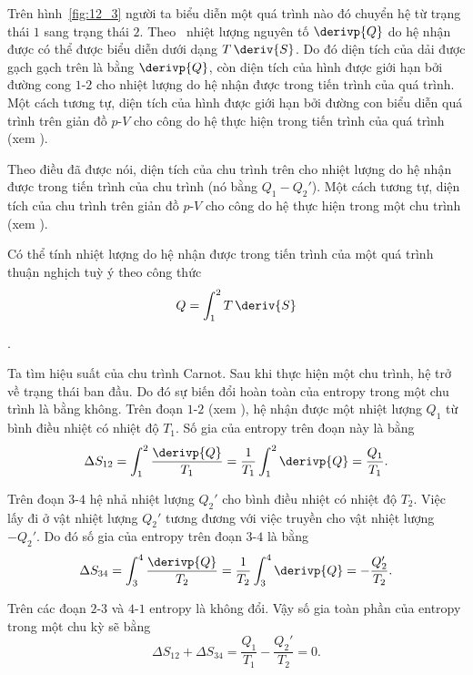 Trên hình~\ref{fig:12_3} người ta biểu diễn một quá trình nào đó chuyển hệ từ trạng thái $1$ sang trạng thái $2$. Theo~ nhiệt lượng nguyên tố $\derivp{Q}$ do hệ nhận được có thể được biểu diễn dưới dạng $T\,\deriv{S}$. Do đó diện tích của dải được gạch gạch trên  là bằng $\derivp{Q}$, còn diện tích của hình được giới hạn bởi đường cong $1$-$2$ cho nhiệt lượng do hệ nhận được trong tiến trình của quá trình. Một cách tương tự, diện tích của hình được giới hạn bởi đường con biểu diễn quá trình trên giản đồ $p$-$V$ cho công do hệ thực hiện trong tiến trình của quá trình (xem ).

Theo điều đã được nói, diện tích của chu trình trên  cho nhiệt lượng do hệ nhận được trong tiến trình của chu trình (nó bằng $Q_1-Q_2'$). Một cách tương tự, diện tích của chu trình trên giản đồ $p$-$V$ cho công do hệ thực hiện trong một chu trình (xem ).

Có thể tính nhiệt lượng do hệ nhận được trong tiến trình của một quá trình thuận nghịch tuỳ ý theo công thức
\begin{equation}\label{eq:12_9}
	Q = \int_{1}^{2} T\,\deriv{S}
\end{equation}

.

Ta tìm hiệu suất của chu trình Carnot. Sau khi thực hiện một chu trình, hệ trở về trạng thái ban đầu. Do đó sự biến đổi hoàn toàn của entropy trong một chu trình là bằng không. Trên đoạn $1$-$2$ (xem ), hệ nhận được một nhiệt lượng $Q_1$ từ bình điều nhiệt có nhiệt độ $T_1$. Số gia của entropy trên đoạn này là bằng
\begin{equation*}
	\Delta S_{12} = \int_{1}^{2} \frac{\derivp{Q}}{T_1} = \frac{1}{T_1} \int_{1}^{2} \derivp{Q} = \frac{Q_1}{T_1}.
\end{equation*}

\noindent
Trên đoạn $3$-$4$ hệ nhả nhiệt lượng $Q_2'$ cho bình điều nhiệt có nhiệt độ $T_2$. Việc lấy đi ở vật nhiệt lượng $Q_2'$ tương đương với việc truyền cho vật nhiệt lượng $-Q_2'$. Do đó số gia của entropy trên đoạn $3$-$4$ là bằng
\begin{equation*}
	\Delta S_{34} = \int_{3}^{4} \frac{\derivp{Q}}{T_2} = \frac{1}{T_2} \int_{3}^{4} \derivp{Q} = -\frac{Q_2'}{T_2}.
\end{equation*}

\noindent
Trên các đoạn $2$-$3$ và $4$-$1$ entropy là không đổi. Vậy số gia toàn phần của entropy trong một chu kỳ sẽ bằng
\begin{equation}\label{eq:12_10}
	\Delta S_{12} + \Delta S_{34} = \frac{Q_1}{T_1} - \frac{Q_2'}{T_2} = 0.
\end{equation}

